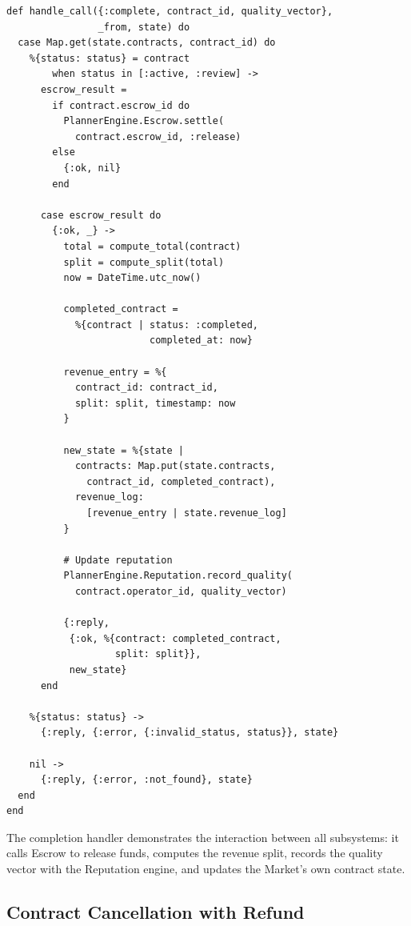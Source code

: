 \documentclass[12pt,a4paper]{article}
\theoremstyle{plain}
\theoremstyle{definition}
\begin{document}
\begin{lstlisting}[caption={Contract completion with revenue distribution},label={lst:market-complete}]
def handle_call({:complete, contract_id, quality_vector},
                _from, state) do
  case Map.get(state.contracts, contract_id) do
    %{status: status} = contract
        when status in [:active, :review] ->
      escrow_result =
        if contract.escrow_id do
          PlannerEngine.Escrow.settle(
            contract.escrow_id, :release)
        else
          {:ok, nil}
        end

      case escrow_result do
        {:ok, _} ->
          total = compute_total(contract)
          split = compute_split(total)
          now = DateTime.utc_now()

          completed_contract =
            %{contract | status: :completed,
                         completed_at: now}

          revenue_entry = %{
            contract_id: contract_id,
            split: split, timestamp: now
          }

          new_state = %{state |
            contracts: Map.put(state.contracts,
              contract_id, completed_contract),
            revenue_log:
              [revenue_entry | state.revenue_log]
          }

          # Update reputation
          PlannerEngine.Reputation.record_quality(
            contract.operator_id, quality_vector)

          {:reply,
           {:ok, %{contract: completed_contract,
                   split: split}},
           new_state}
      end

    %{status: status} ->
      {:reply, {:error, {:invalid_status, status}}, state}

    nil ->
      {:reply, {:error, :not_found}, state}
  end
end
\end{lstlisting}

The completion handler demonstrates the interaction between all subsystems: it calls Escrow to release funds, computes the revenue split, records the quality vector with the Reputation engine, and updates the Market's own contract state.

\subsection{Contract Cancellation with Refund}
\end{document}
